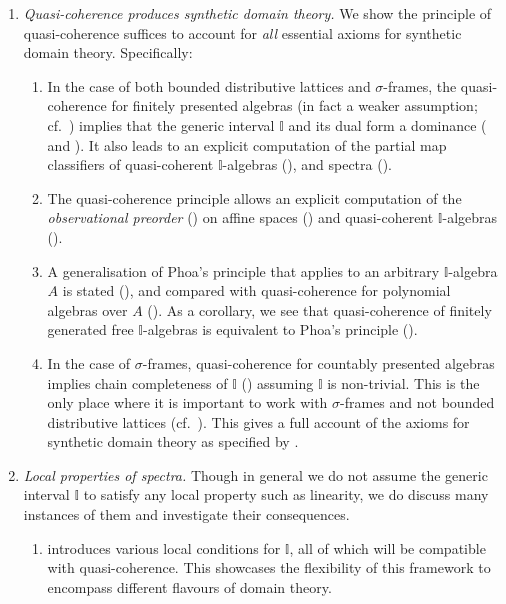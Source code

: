 \documentclass[a4paper,12pt]{amsart}
\theoremstyle{definition}
\newcommand{\mbb}[1]{\mathbb{#1}}
\newcommand{\I}{\mbb I}
\begin{document}
\begin{enumerate}[leftmargin=*]
  \item \emph{Quasi-coherence produces synthetic domain theory.} We show the principle of quasi-coherence suffices to account for \emph{all} essential axioms for synthetic domain theory. Specifically:
  \begin{enumerate}
    \item\label{contribution:dominance} In the case of both bounded distributive lattices and $\sigma$-frames, the quasi-coherence for finitely presented algebras (in fact a weaker assumption; cf.\ ) implies that the generic interval $\I$ and its dual form a dominance ( and ). It also leads to an explicit computation of the partial map classifiers of quasi-coherent $\I$-algebras (), and spectra ().
    \item The quasi-coherence principle allows an explicit computation of the \emph{observational preorder} () on affine spaces () and quasi-coherent $\I$-algebras ().
    \item A generalisation of Phoa's principle that applies to an arbitrary $\I$-algebra $A$ is stated (), and compared with quasi-coherence for polynomial algebras over $A$ (). As a corollary, we see that quasi-coherence of finitely generated free $\I$-algebras is equivalent to Phoa's principle ().
    \item In the case of $\sigma$-frames, quasi-coherence for countably presented algebras implies chain completeness of $\I$ () assuming $\I$ is non-trivial. 
    This is the only place where it is important to work with $\sigma$-frames and not bounded distributive lattices (cf.~). This gives a full account of the axioms for synthetic domain theory as specified by \citet{hyland1990first}. 
  \end{enumerate}

  \item \emph{Local properties of spectra.} Though in general we do not assume the generic interval $\I$ to satisfy any local property such as linearity, we do discuss many instances of them and investigate their consequences.
  \begin{enumerate}

    \item {} introduces various local conditions for $\I$, all of which will be compatible with quasi-coherence. This showcases the flexibility of this framework to encompass different flavours of domain theory.


\end{enumerate}
\end{enumerate}
\end{document}
